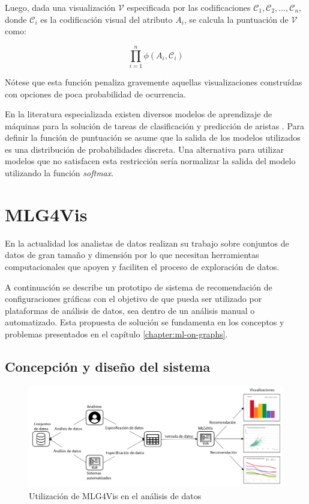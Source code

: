 Luego, dada una visualizaci\'on $\mathcal{V}$ especificada por las codificaciones $\mathcal{C}_1, \mathcal{C}_2, ..., \mathcal{C}_n$,
donde $\mathcal{C}_i$ es la codificaci\'on visual del atributo $A_i$, se calcula la puntuaci\'on de $\mathcal{V}$ como:

$$
           \overset{n}{\underset{i=1}{\prod}} \phi(A_i, \mathcal{C}_i)
$$


N\'otese que esta funci\'on penaliza gravemente aquellas visualizaciones
constru\'idas con opciones de poca probabilidad de ocurrencia.

En la literatura especializada existen diversos modelos de aprendizaje de m\'aquinas  para
la soluci\'on de tareas de clasificaci\'on \cite{aly2005survey} y predicci\'on de aristas \cite{lu2011link}.
Para definir la funci\'on de puntuaci\'on se asume que la salida de los modelos utilizados es una distribuci\'on
de probabilidades discreta. Una alternativa para utilizar modelos que no satisfacen
esta restricci\'on ser\'ia normalizar la salida del modelo utilizando la funci\'on \textit{softmax}.


\chapter{MLG4Vis}\label{chapter:proposal}

En la actualidad los analistas de datos realizan su trabajo
sobre conjuntos de datos de gran tama\~no y dimensi\'on por lo que
necesitan herramientas computacionales que apoyen y faciliten
el proceso de exploraci\'on de datos.

A continuaci\'on se describe un prototipo de sistema de recomendaci\'on de
configuraciones gr\'aficas con el objetivo de que pueda ser utilizado
por plataformas de an\'alisis de datos, sea dentro de un an\'alisis manual o 
automatizado. Esta propuesta de soluci\'on se fundamenta en los conceptos
y problemas presentados en el cap\'itulo \ref{chapter:ml-on-graphs}.

\section{Concepci\'on y dise\~no del sistema}

\begin{figure}[h!]
    \includegraphics[width=\linewidth]{Graphics/mlg4vis.png}
    \caption{Utilizaci\'on de MLG4Vis en el an\'alisis de datos}
    \label{fig: mlg4vis}
\end{figure}


